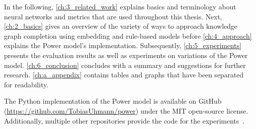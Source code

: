 In the following, \autoref{ch:3_related_work} explains basics and terminology about neural networks and metrics that are used throughout this thesis. Next, \autoref{ch:2_basics} gives an overview of the variety of ways to approach knowledge graph completion using embedding and rule-based models before \autoref{ch:4_approach} explains the Power model's implementation. Subsequently, \autoref{ch:5_experiments} presents the evaluation results as well as experiments on variations of the Power model. \autoref{ch:6_conclusion} concludes with a summary and suggestions for further research. \autoref{ch:a_appendix} contains tables and graphs that have been separated for readability.

The Python implementation of the Power model is available on GitHub (\url{https://github.com/TobiasUhmann/power}) under the MIT open-source license. Additionally, multiple other repositories provide the code for the experiments~\cite{GitHubAttention, GitHubContext, GitHubPower}.
